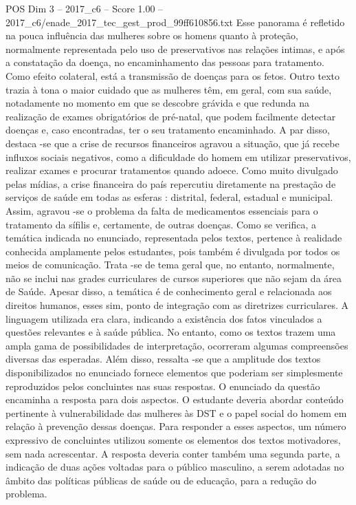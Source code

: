 \begin{textsample}{POS Dim 3 – 2017\_c6 – Score 1.00 – 2017\_c6/enade\_2017\_tec\_gest\_prod\_99ff610856.txt}
Esse panorama é refletido na pouca influência das mulheres sobre os homens quanto à proteção, normalmente representada pelo uso de preservativos nas relações intimas, e após a constatação da doença, no encaminhamento das pessoas para tratamento.
Como efeito colateral, está a transmissão de doenças para os fetos.
Outro texto trazia à tona o maior cuidado que as mulheres têm, em geral, com sua saúde, notadamente no momento em que se descobre grávida e que redunda na realização de exames obrigatórios de pré-natal, que podem facilmente detectar doenças e, caso encontradas, ter o seu tratamento encaminhado.
A par disso, destaca -se que a crise de recursos financeiros agravou a situação, que já recebe influxos sociais negativos, como a dificuldade do homem em utilizar preservativos, realizar exames e procurar tratamentos quando adoece.
Como muito divulgado pelas mídias, a crise financeira do país repercutiu diretamente na prestação de serviços de saúde em todas as esferas : distrital, federal, estadual e municipal.
Assim, agravou -se o problema da falta de medicamentos essenciais para o tratamento da sífilis e, certamente, de outras doenças.
Como se verifica, a temática indicada no enunciado, representada pelos textos, pertence à realidade conhecida amplamente pelos estudantes, pois também é divulgada por todos os meios de comunicação.
Trata -se de tema geral que, no entanto, normalmente, não se inclui nas grades curriculares de cursos superiores que não sejam da área de Saúde.
Apesar disso, a temática é de conhecimento geral e relacionada aos direitos humanos, esses sim, ponto de integração com as diretrizes curriculares.
A linguagem utilizada era clara, indicando a existência dos fatos vinculados a questões relevantes e à saúde pública.
No entanto, como os textos trazem uma ampla gama de possibilidades de interpretação, ocorreram algumas compreensões diversas das esperadas.
Além disso, ressalta -se que a amplitude dos textos disponibilizados no enunciado fornece elementos que poderiam ser simplesmente reproduzidos pelos concluintes nas suas respostas.
O enunciado da questão encaminha a resposta para dois aspectos.
O estudante deveria abordar conteúdo pertinente à vulnerabilidade das mulheres às DST e o papel social do homem em relação à prevenção dessas doenças.
Para responder a esses aspectos, um número expressivo de concluintes utilizou somente os elementos dos textos motivadores, sem nada acrescentar.
A resposta deveria conter também uma segunda parte, a indicação de duas ações voltadas para o público masculino, a serem adotadas no âmbito das políticas públicas de saúde ou de educação, para a redução do problema.

\end{textsample}
